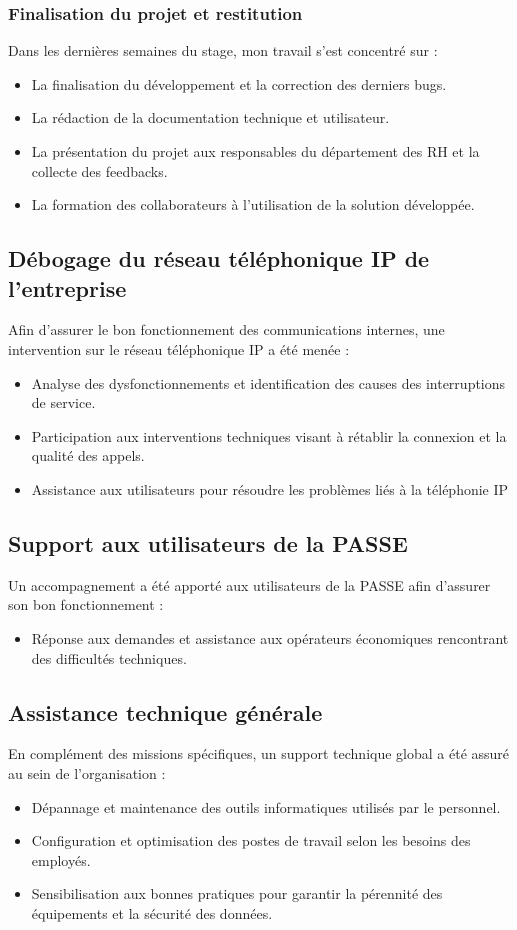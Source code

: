\subsubsection{Finalisation du projet et restitution}
Dans les dernières semaines du stage, mon travail s'est concentré sur :

\begin{itemize}
    \item La finalisation du développement et la correction des derniers bugs.
    \item La rédaction de la documentation technique et utilisateur.
    \item La présentation du projet aux responsables du département des \ac{RH} et la collecte des feedbacks.
    \item La formation des collaborateurs à l'utilisation de la solution développée.

\end{itemize}
\subsection{Débogage du réseau téléphonique IP de l'entreprise}
Afin d’assurer le bon fonctionnement des communications internes, une intervention sur le réseau téléphonique IP a été menée :
\begin{itemize}
    \item Analyse des dysfonctionnements et identification des causes des interruptions de service.
    \item  Participation aux interventions techniques visant à rétablir la connexion et  la qualité des appels.
    \item Assistance aux utilisateurs pour résoudre les problèmes liés à la téléphonie IP
\end{itemize}

\subsection{Support aux utilisateurs de la \ac{PASSE}}
Un accompagnement a été apporté aux utilisateurs de la \ac{PASSE} afin d’assurer son bon fonctionnement :
\begin{itemize}
    \item Réponse aux demandes et assistance aux opérateurs économiques rencontrant des difficultés techniques.
\end{itemize}
\subsection{Assistance technique générale}
En complément des missions spécifiques, un support technique global a été assuré au sein de l’organisation :
\begin{itemize}
    \item Dépannage et maintenance des outils informatiques utilisés par le personnel.
    \item Configuration et optimisation des postes de travail selon les besoins des employés.
    \item Sensibilisation aux bonnes pratiques pour garantir la pérennité des équipements et la sécurité des données.
\end{itemize}

